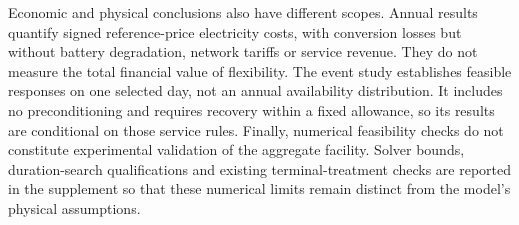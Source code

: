 Economic and physical conclusions also have different scopes. Annual results quantify signed reference-price electricity costs, with conversion losses but without battery degradation, network tariffs or service revenue. They do not measure the total financial value of flexibility. The event study establishes feasible responses on one selected day, not an annual availability distribution. It includes no preconditioning and requires recovery within a fixed allowance, so its results are conditional on those service rules. Finally, numerical feasibility checks do not constitute experimental validation of the aggregate facility. Solver bounds, duration-search qualifications and existing terminal-treatment checks are reported in the supplement so that these numerical limits remain distinct from the model's physical assumptions.
